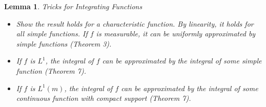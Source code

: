 \documentclass[12pt]{Qual}
\newtheorem{lemma}{Lemma}
\begin{document}
\vspace{0.5cm}
\begin{lemma}{\Large\textit{Tricks for Integrating Functions}}

\begin{itemize}
\setlength\itemsep{-0.1em}
\renewcommand\labelitemi{\faCoffee}
    \item Show the result holds for a characteristic function. By linearity, it holds for all simple functions. If $f$ is measurable, it can be uniformly approximated by simple functions (Theorem 3).
    \item If $f$ is $L^1$, the integral of $f$ can be approximated by the integral of some simple function (Theorem 7).
    \item If $f$ is $L^1(m)$, the integral of $f$ can be approximated by the integral of some continuous function with compact support (Theorem 7).
\end{itemize}

\end{lemma}
\vspace{0.5cm}
\end{document}
